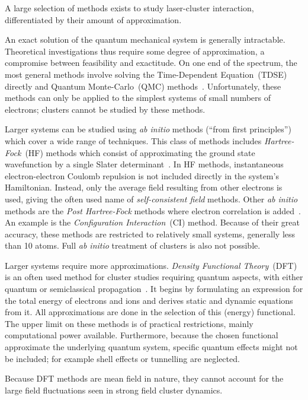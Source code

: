 A large selection of methods exists to study laser-cluster interaction,
differentiated by their amount of approximation.

An exact solution of the quantum mechanical system is generally
intractable. Theoretical investigations thus require some degree of
approximation, a compromise between feasibility and exactitude. On one end of
the spectrum, the most general methods involve solving the
Time-Dependent \schrodinger Equation~(TDSE) directly and Quantum Monte-Carlo~(QMC)
methods~\cite{Nightingale1998}. Unfortunately, these methods can only be applied to the simplest
systems of small numbers of electrons; clusters cannot be studied by these
methods.

Larger systems can be studied using \textit{ab initio} methods (``from
first principles'') which cover a wide range of techniques. This class of
methods includes \textit{Hartree-Fock}~(HF) methods which consist of
approximating the ground state wavefunction by a single Slater
determinant~\cite{Laaksonen1986,Schafer2009}.
In HF methods, instantaneous electron-electron Coulomb repulsion is not
included directly in the system's Hamiltonian. Instead, only the average field
resulting from other electrons is used, giving the often used name of
\textit{self-consistent field} methods. Other \textit{ab
initio} methods are the \textit{Post Hartree-Fock} methods where electron
correlation is added~\cite{Cramer2004}. An example is the \textit{Configuration Interaction}~(CI)
method. Because of their great accuracy, these methods are restricted to
relatively small systems, generally less than 10 atoms. Full \textit{ab initio}
treatment of clusters is also not possible.

Larger systems require
more approximations. \textit{Density Functional Theory}~(DFT)
is an often used method for cluster studies requiring quantum aspects, with
either quantum or semiclassical propagation~\cite{Schafer2009,Fennel2010}.
It begins by formulating an
expression for the total energy of electrons and ions and derives static and
dynamic equations from it. All approximations are done in the selection of this
(energy) functional. The upper limit on these methods is of practical restrictions,
mainly computational power available. Furthermore, because the chosen
functional approximate the underlying quantum system, specific quantum effects
might not be included; for example shell effects or tunnelling are neglected.

Because DFT methods are mean field in nature, they cannot account for the large
field fluctuations seen in strong field cluster dynamics.

